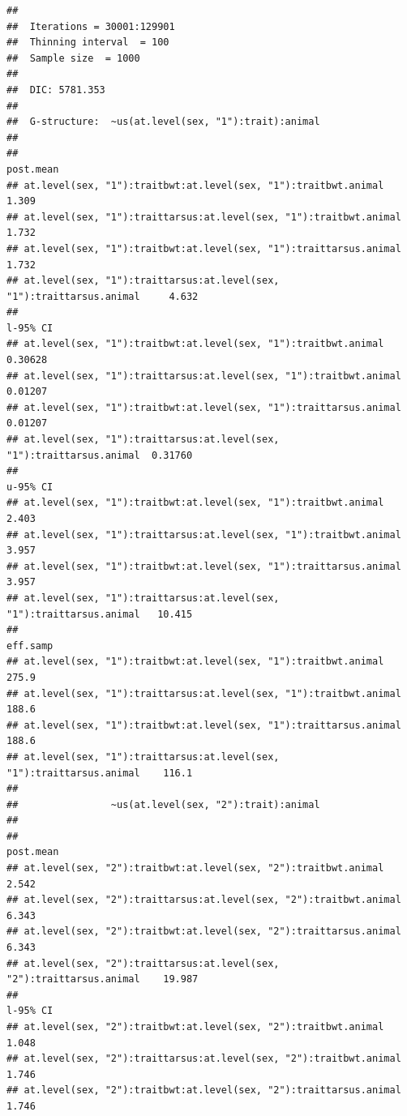 \documentclass[
  12pt,
]{book}
\begin{document}
\begin{verbatim}
## 
##  Iterations = 30001:129901
##  Thinning interval  = 100
##  Sample size  = 1000 
## 
##  DIC: 5781.353 
## 
##  G-structure:  ~us(at.level(sex, "1"):trait):animal
## 
##                                                                      post.mean
## at.level(sex, "1"):traitbwt:at.level(sex, "1"):traitbwt.animal           1.309
## at.level(sex, "1"):traittarsus:at.level(sex, "1"):traitbwt.animal        1.732
## at.level(sex, "1"):traitbwt:at.level(sex, "1"):traittarsus.animal        1.732
## at.level(sex, "1"):traittarsus:at.level(sex, "1"):traittarsus.animal     4.632
##                                                                      l-95% CI
## at.level(sex, "1"):traitbwt:at.level(sex, "1"):traitbwt.animal        0.30628
## at.level(sex, "1"):traittarsus:at.level(sex, "1"):traitbwt.animal     0.01207
## at.level(sex, "1"):traitbwt:at.level(sex, "1"):traittarsus.animal     0.01207
## at.level(sex, "1"):traittarsus:at.level(sex, "1"):traittarsus.animal  0.31760
##                                                                      u-95% CI
## at.level(sex, "1"):traitbwt:at.level(sex, "1"):traitbwt.animal          2.403
## at.level(sex, "1"):traittarsus:at.level(sex, "1"):traitbwt.animal       3.957
## at.level(sex, "1"):traitbwt:at.level(sex, "1"):traittarsus.animal       3.957
## at.level(sex, "1"):traittarsus:at.level(sex, "1"):traittarsus.animal   10.415
##                                                                      eff.samp
## at.level(sex, "1"):traitbwt:at.level(sex, "1"):traitbwt.animal          275.9
## at.level(sex, "1"):traittarsus:at.level(sex, "1"):traitbwt.animal       188.6
## at.level(sex, "1"):traitbwt:at.level(sex, "1"):traittarsus.animal       188.6
## at.level(sex, "1"):traittarsus:at.level(sex, "1"):traittarsus.animal    116.1
## 
##                ~us(at.level(sex, "2"):trait):animal
## 
##                                                                      post.mean
## at.level(sex, "2"):traitbwt:at.level(sex, "2"):traitbwt.animal           2.542
## at.level(sex, "2"):traittarsus:at.level(sex, "2"):traitbwt.animal        6.343
## at.level(sex, "2"):traitbwt:at.level(sex, "2"):traittarsus.animal        6.343
## at.level(sex, "2"):traittarsus:at.level(sex, "2"):traittarsus.animal    19.987
##                                                                      l-95% CI
## at.level(sex, "2"):traitbwt:at.level(sex, "2"):traitbwt.animal          1.048
## at.level(sex, "2"):traittarsus:at.level(sex, "2"):traitbwt.animal       1.746
## at.level(sex, "2"):traitbwt:at.level(sex, "2"):traittarsus.animal       1.746

\end{verbatim}
\end{document}
